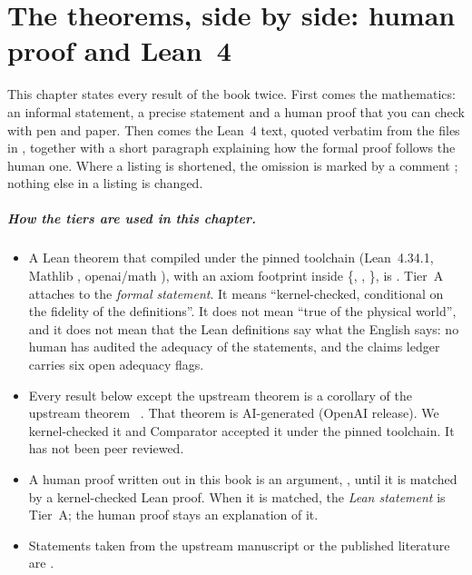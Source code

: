 \chapter{The theorems, side by side: human proof and Lean~4}\label{ch2:chapter}

This chapter states every result of the book twice. First comes the mathematics: an informal statement, a precise
statement and a human proof that you can check with pen and paper. Then comes the Lean~4 text, quoted verbatim from the
files in , together with a short paragraph explaining how the formal proof follows the
human one. Where a listing is shortened, the omission is marked by a comment ; nothing else in a listing is
changed.

\paragraph{How the tiers are used in this chapter.}
\begin{itemize}
\item A Lean theorem that compiled under the pinned toolchain (Lean~4.34.1, Mathlib , openai/math
  ), with an axiom footprint inside \{, , \}, is
  \tierA. Tier~A attaches to the \emph{formal statement}. It means ``kernel-checked, conditional on the fidelity of the
  definitions''. It does not mean ``true of the physical world'', and it does not mean that the Lean definitions say what
  the English says: no human has audited the adequacy of the statements, and the claims ledger carries six open
  adequacy flags.
\item Every result below except the upstream theorem is a corollary of the upstream theorem
  ~\cite{oai}. That theorem is AI-generated (OpenAI release). We
  kernel-checked it and Comparator accepted it under the pinned toolchain. It has not been peer reviewed.
\item A human proof written out in this book is an argument, \tierC, until it is matched by a kernel-checked Lean
  proof. When it is matched, the \emph{Lean statement} is Tier~A; the human proof stays an explanation of it.
\item Statements taken from the upstream manuscript or the published literature are \tierL.
\end{itemize}

